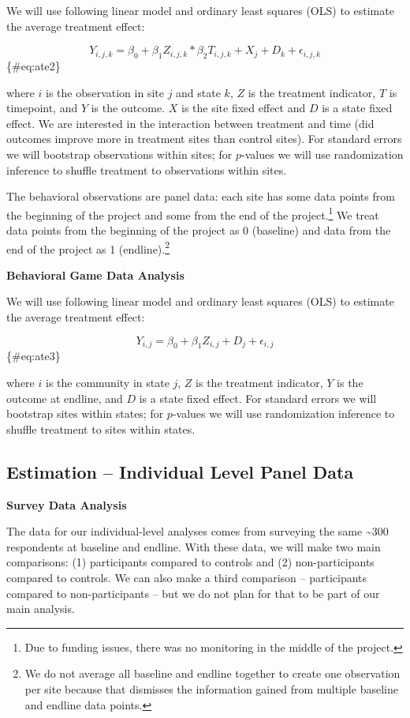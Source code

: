 \documentclass[
]{article}
\begin{document}
We will use following linear model and ordinary least squares (OLS) to
estimate the average treatment effect:

\[ Y_{i,j,k} = \beta_0 + \beta_1 Z_{i,j,k} * \beta_2 T_{i,j,k} + X_{j} + D_{k} + \epsilon_{i,j, k} \]\{\#eq:ate2\}

where \(i\) is the observation in site \(j\) and state \(k\), \(Z\) is
the treatment indicator, \(T\) is timepoint, and \(Y\) is the outcome.
\(X\) is the site fixed effect and \(D\) is a state fixed effect. We are
interested in the interaction between treatment and time (did outcomes
improve more in treatment sites than control sites). For standard errors
we will bootstrap observations within sites; for \(p\)-values we will
use randomization inference to shuffle treatment to observations within
sites.

The behavioral observations are panel data: each site has some data
points from the beginning of the project and some from the end of the
project.\footnote{Due to funding issues, there was no monitoring in the
  middle of the project.} We treat data points from the beginning of the
project as 0 (baseline) and data from the end of the project as 1
(endline).\footnote{We do not average all baseline and endline together
  to create one observation per site because that dismisses the
  information gained from multiple baseline and endline data points.}

\textbf{Behavioral Game Data Analysis}

We will use following linear model and ordinary least squares (OLS) to
estimate the average treatment effect:

\[ Y_{i,j} = \beta_0 + \beta_1 Z_{i,j} + D_{j} + \epsilon_{i,j} \]\{\#eq:ate3\}

where \(i\) is the community in state \(j\), \(Z\) is the treatment
indicator, \(Y\) is the outcome at endline, and \(D\) is a state fixed
effect. For standard errors we will bootstrap sites within states; for
\(p\)-values we will use randomization inference to shuffle treatment to
sites within states.

\hypertarget{est_ind}{%
\subsection{Estimation -- Individual Level Panel Data}\label{est_ind}}

\textbf{Survey Data Analysis}

The data for our individual-level analyses comes from surveying the same
\textasciitilde300 respondents at baseline and endline. With these data,
we will make two main comparisons: (1) participants compared to controls
and (2) non-participants compared to controls. We can also make a third
comparison -- participants compared to non-participants -- but we do not
plan for that to be part of our main analysis.
\end{document}
